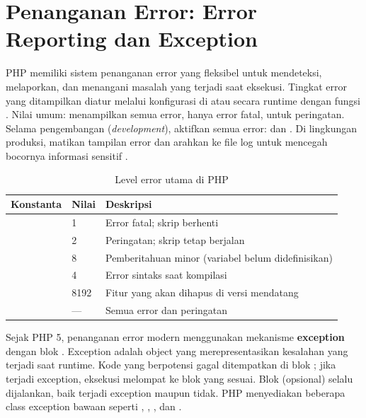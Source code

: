 ﻿\section{Penanganan Error: Error Reporting dan Exception}

PHP memiliki sistem penanganan error yang fleksibel untuk mendeteksi, melaporkan, dan menangani masalah yang terjadi saat eksekusi. Tingkat error yang ditampilkan diatur melalui konfigurasi  di  atau secara runtime dengan fungsi . Nilai umum:  menampilkan semua error,  hanya error fatal,  untuk peringatan. Selama pengembangan (\textit{development}), aktifkan semua error:  dan . Di lingkungan produksi, matikan tampilan error dan arahkan ke file log untuk mencegah bocornya informasi sensitif \cite{phpManual}.

\begin{table}[H]
\centering
\begin{tabular}{|P{3cm}|P{2cm}|P{7cm}|}
\hline
\textbf{Konstanta} & \textbf{Nilai} & \textbf{Deskripsi} \\
\hline
{} & 1 & Error fatal; skrip berhenti \\
\hline
{} & 2 & Peringatan; skrip tetap berjalan \\
\hline
{} & 8 & Pemberitahuan minor (variabel belum didefinisikan) \\
\hline
{} & 4 & Error sintaks saat kompilasi \\
\hline
{} & 8192 & Fitur yang akan dihapus di versi mendatang \\
\hline
{} & --- & Semua error dan peringatan \\
\hline
\end{tabular}
\caption{Level error utama di PHP}
\end{table}

Sejak PHP 5, penanganan error modern menggunakan mekanisme \textbf{exception} dengan blok . Exception adalah object yang merepresentasikan kesalahan yang terjadi saat runtime. Kode yang berpotensi gagal ditempatkan di blok ; jika terjadi exception, eksekusi melompat ke blok  yang sesuai. Blok  (opsional) selalu dijalankan, baik terjadi exception maupun tidak. PHP menyediakan beberapa class exception bawaan seperti , , , dan  \cite{phpRightWay}.

